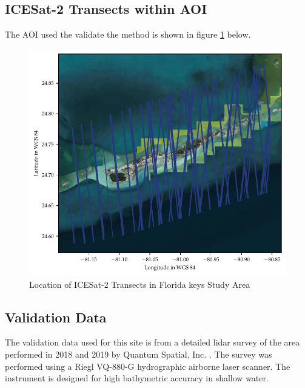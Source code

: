 \subsection{ICESat-2 Transects within AOI}
The AOI used the validate the method is shown in figure \ref{fig:keys_transects} below.
\begin{figure}[h]
    \centering
    \includegraphics{figures/florida_keys_tracklines.pdf}
    \caption{Location of ICESat-2 Transects in Florida keys Study Area}
    \label{fig:keys_transects}
\end{figure}
\subsection{Validation Data}
The validation data used for this site is from a detailed lidar survey of the area performed in 2018 and 2019 by Quantum Spatial, Inc. \parencite{Keys2019Lidar}. The survey was performed using a Riegl VQ-880-G hydrographic airborne laser scanner. The instrument is designed for high bathymetric accuracy in shallow water.

